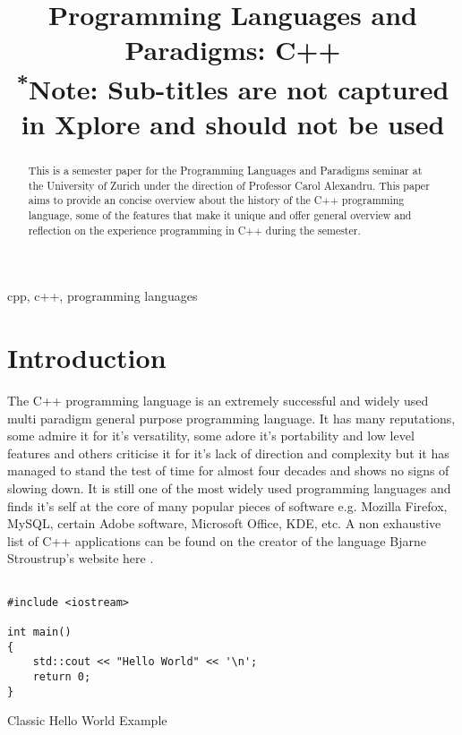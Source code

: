 \documentclass[conference, a4paper]{IEEEtran}
\begin{document}
\title{Programming Languages and Paradigms: C++\\
{\footnotesize \textsuperscript{*}Note: Sub-titles are not captured in Xplore and
should not be used}
}

\author{
}

\maketitle

\begin{abstract}
This is a semester paper for the Programming Languages and Paradigms seminar at the University of Zurich under the direction of Professor Carol Alexandru. This paper aims to provide an concise overview about the history of the C++ programming language, some of the features that make it unique and offer general overview and reflection on the experience programming in C++ during the semester.\\
\end{abstract}

\begin{IEEEkeywords}
cpp, c++, programming languages
\end{IEEEkeywords}

\section{Introduction}
The C++ programming language is an extremely successful and widely used multi paradigm general purpose programming language. It has many reputations, some admire it for it's versatility, some adore it's portability and low level features and others criticise it for it's lack of direction and complexity but it has managed to stand the test of time for almost four decades and shows no signs of slowing down. It is still one of the most widely used programming languages and finds it's self at the core of many popular pieces of software e.g. Mozilla Firefox, MySQL, certain Adobe software, Microsoft Office, KDE, etc. A non exhaustive list of C++ applications can be found on the creator of the language Bjarne Stroustrup's website here \cite{cppapplications} .

\begin{listing}[h]

\begin{verbatim}

#include <iostream>

int main()
{
    std::cout << "Hello World" << '\n';
    return 0;
}

\end{verbatim}

\caption{Classic Hello World Example} \label{listing:1}
\end{listing}
\end{document}
